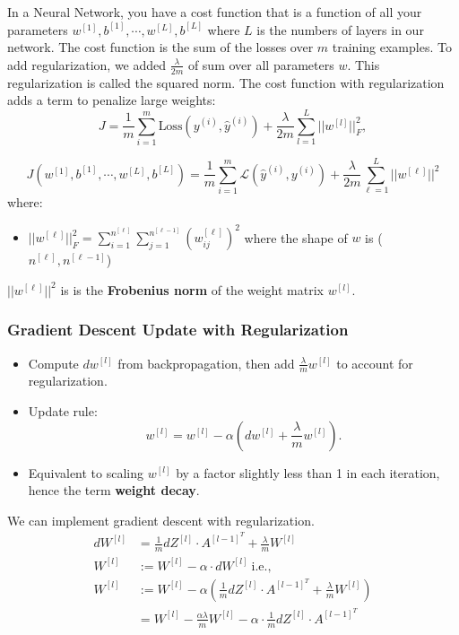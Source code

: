\documentclass[letterpaper,12pt,notitlepage,twoside]{report}
\begin{document}
In a Neural Network, you have a cost function that is a function of all your parameters \(w^{[1]}, b^{[1]}, \cdots, w^{[L]}, b^{[L]}\) where \( L \) is 
the numbers of layers in our network. The cost function is the sum of the losses over \( m \) training examples. To add regularization, we added \( \frac{\lambda}{2m} \) 
of sum over all parameters \( w \). This regularization is called the squared norm. The cost function with regularization adds a term to penalize large weights:
    \[
    J = \frac{1}{m} \sum_{i=1}^m \text{Loss}(y^{(i)}, \hat{y}^{(i)}) + \frac{\lambda}{2m} \sum_{l=1}^L ||w^{[l]}||_F^2,
    \]

\begin{equation}
J(w^{[1]}, b^{[1]}, \cdots, w^{[L]}, b^{[L]}) = \frac{1}{m} \sum_{i=1}^m \mathcal{L} (\hat{y}^{(i)}, y^{(i)}) + \frac{\lambda}{2m} \sum_{\ell=1}^L ||w^{[\ell]}||^2
\end{equation}
where:
\begin{itemize}
\item \( ||w^{[\ell]}||_F^2 = \sum_{i=1}^{n^{[\ell]}} \sum_{j=1}^{n^{[\ell-1]}} (w_{ij}^{[\ell]})^2 \) where the shape of \( w \) is (\(n^{[\ell]}, n^{[\ell-1]} \))
\end{itemize}

\( ||w^{[\ell]}||^2 \) is is the \textbf{Frobenius norm} of the weight matrix \( w^{[l]} \).

\subsubsection*{Gradient Descent Update with Regularization}
\begin{itemize}
    \item Compute \( dw^{[l]} \) from backpropagation, then add \( \frac{\lambda}{m} w^{[l]} \) to account for regularization.
    \item Update rule: 
    \[
    w^{[l]} = w^{[l]} - \alpha \left( dw^{[l]} + \frac{\lambda}{m} w^{[l]} \right).
    \]
    \item Equivalent to scaling \( w^{[l]} \) by a factor slightly less than 1 in each iteration, hence the term \textbf{weight decay}.
\end{itemize}

We can implement gradient descent with regularization. 
\begin{align*}
dW^{[l]} &= \frac{1}{m} dZ^{[l]} \cdot A^{[l-1]^T} + \frac{\lambda}{m} W^{[l]} \\
W^{[l]} &:= W^{[l]} - \alpha \cdot dW^{[l]} ~\text{i.e.,} \\
W^{[l]} &:= W^{[l]} - \alpha \left( \frac{1}{m} dZ^{[l]} \cdot A^{[l-1]^T} + \frac{\lambda}{m} W^{[l]} \right) \\
	&= W^{[l]} - \frac{\alpha \lambda}{m} W^{[l]} - \alpha \cdot \frac{1}{m} dZ^{[l]} \cdot A^{[l-1]^T} 
\end{align*}
\end{document}
